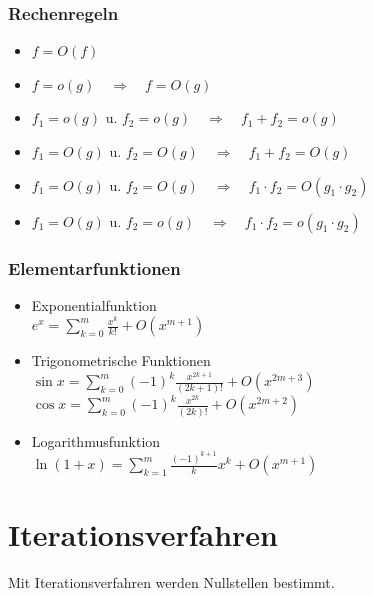 \documentclass[6pt,a4paper]{scrartcl}
\begin{document}
\begin{multicols}{4}
	\subsubsection{Rechenregeln}
	\begin{itemize}\itemsep-1pt
		\item $f = O(f)$
		\item $f = o(g) \quad\Rightarrow\quad f = O(g)$
		\item $f_1 = o(g)$ u. $f_2 = o(g) \quad\Rightarrow\quad f_1 + f_2 = o(g)$
		\item $f_1 = O(g)$ u. $f_2 = O(g) \quad\Rightarrow\quad f_1 + f_2 = O(g)$
		\item $f_1 = O(g)$ u. $f_2 = O(g) \quad\Rightarrow\quad f_1 \cdot f_2 = O(g_1 \cdot g_2)$
		\item $f_1 = O(g)$ u. $f_2 = o(g) \quad\Rightarrow\quad f_1 \cdot f_2 = o(g_1 \cdot g_2)$
	\end{itemize}
	\subsubsection{Elementarfunktionen}
	\begin{itemize}\itemsep-1pt
		\item Exponentialfunktion\\
		$e^x = \sum\limits_{k = 0}^m\frac{x^k}{k!} + O(x^{m + 1})$
		\item Trigonometrische Funktionen\\
		$\sin{x} = \sum\limits_{k = 0}^m(-1)^k\frac{x^{2k + 1}}{(2k + 1)!} + O(x^{2m + 3})$\\
		$\cos{x} = \sum\limits_{k = 0}^m(-1)^k\frac{x^{2k}}{(2k)!} + O(x^{2m + 2})$
		\item Logarithmusfunktion\\
		$\ln{(1 + x)} = \sum\limits_{k = 1}^m\frac{(-1)^{k + 1}}{k}x^k + O(x^{m + 1})$
	\end{itemize}
	

\section{Iterationsverfahren}
Mit Iterationsverfahren werden Nullstellen bestimmt.

\end{multicols}
\end{document}
